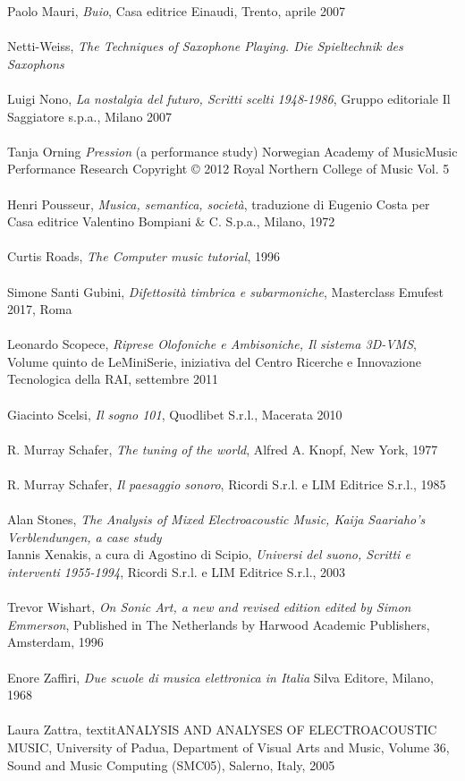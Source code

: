 Paolo Mauri, \textit{Buio}, Casa editrice Einaudi, Trento, aprile 2007 \\
\\
Netti-Weiss, \textit{The Techniques of Saxophone Playing. Die Spieltechnik des Saxophons} \\
\\
Luigi Nono, \textit{La nostalgia del futuro, Scritti scelti 1948-1986}, Gruppo editoriale Il Saggiatore s.p.a., Milano 2007 \\
\\
Tanja Orning \textit{Pression} (a performance study) Norwegian Academy of MusicMusic Performance Research Copyright © 2012 Royal Northern College of Music Vol. 5 \\
\\
Henri Pousseur, \textit{Musica, semantica, società}, traduzione di Eugenio Costa per Casa editrice Valentino Bompiani \& C. S.p.a., Milano, 1972 \\
\\
Curtis Roads, \textit{The Computer music tutorial}, 1996 \\
\\
Simone Santi Gubini, \textit{Difettosità timbrica e subarmoniche}, Masterclass Emufest  2017, Roma \\
\\
Leonardo Scopece, \textit{Riprese Olofoniche e Ambisoniche, Il sistema 3D-VMS}, Volume quinto de LeMiniSerie, iniziativa del Centro Ricerche e Innovazione Tecnologica della RAI, settembre 2011 \\
\\
Giacinto Scelsi, \textit{Il sogno 101}, Quodlibet S.r.l., Macerata 2010 \\
\\
R. Murray Schafer, \textit{The tuning of the world}, Alfred A. Knopf, New York, 1977 \\
\\
R. Murray Schafer, \textit{Il paesaggio sonoro}, Ricordi S.r.l. e LIM Editrice S.r.l., 1985 \\
\\
Alan Stones, \textit{The Analysis of Mixed Electroacoustic Music, Kaija Saariaho's Verblendungen, a case study}
\\
Iannis Xenakis, a cura di Agostino di Scipio, \textit{Universi del suono, Scritti e interventi 1955-1994}, Ricordi S.r.l. e LIM Editrice S.r.l., 2003 \\
\\
Trevor Wishart, \textit{On Sonic Art, a new and revised edition edited by Simon Emmerson}, Published in The Netherlands by Harwood Academic Publishers, Amsterdam, 1996 \\
\\
Enore Zaffiri, \textit{Due scuole di musica elettronica in Italia} Silva Editore, Milano, 1968 \\
\\
Laura Zattra, textit{ANALYSIS AND ANALYSES OF ELECTROACOUSTIC MUSIC}, University of Padua, Department of Visual Arts and Music, Volume 36, Sound and Music Computing (SMC05), Salerno, Italy, 2005